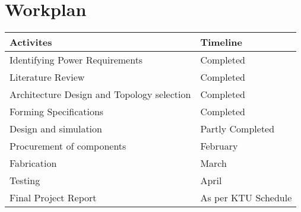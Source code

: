 \chapter{Workplan}
\begin{table}[h]
	\begin{center}
	\begin{tabular}{|l|l|}
		\hline
		\bf{Activites}                                  & \bf{Timeline}            \\ \hline
		Identifying Power Requirements             & Completed           \\ \hline
		Literature Review                          & Completed           \\ \hline
		Architecture Design and Topology selection & Completed           \\ \hline
		Forming Specifications                     & Completed           \\ \hline
		Design and simulation                      & Partly Completed    \\ \hline
		Procurement of components                  & February            \\ \hline
		Fabrication                                & March               \\ \hline
		Testing                                    & April               \\ \hline
		Final Project Report                       & As per KTU Schedule \\ \hline
	\end{tabular}
\end{center}
\end{table}